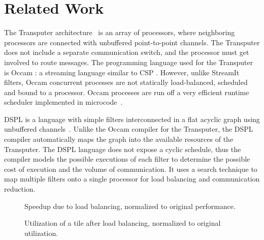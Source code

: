 \section{Related Work}
\label{sec:related}

The Transputer architecture~\cite{transputer88} is an array of
processors, where neighboring processors are connected with unbuffered
point-to-point channels.  The Transputer does not include a separate
communication switch, and the processor must get involved to route
messages.  The programming language used for the Transputer is Occam
\cite{occammanual}: a streaming language similar to CSP
\cite{Hoare78}.  However, unlike StreamIt filters, Occam concurrent
processes are not statically load-balanced, scheduled and bound to a
processor. Occam processes are run off a very efficient runtime
scheduler implemented in microcode~\cite{may87communicating}.

DSPL is a language with simple filters interconnected in a flat acyclic
graph using unbuffered channels~\cite{Thiel93}.  Unlike the Occam
compiler for the Transputer, the DSPL compiler automatically maps the
graph into the available resources of the Transputer. The DSPL language
does not expose a cyclic schedule, thus the compiler models the
possible executions of each filter to determine the possible cost of
execution and the volume of communication. It uses a search technique
to map multiple filters onto a single processor for load balancing and
communication reduction. 

\begin{figure}
\begin{minipage}{3.2in}
\centering
{}
\caption{Speedup due to load balancing, normalized to original performance.
\protect\label{fig:opt-diagram}}
\end{minipage}
\hspace{0.1in}
\begin{minipage}{3.2in}
\centering
{}
\caption{Utilization of a tile after load balancing, normalized to original utilization.\protect\label{fig:utilization-diagram}}
\end{minipage}
\end{figure}

